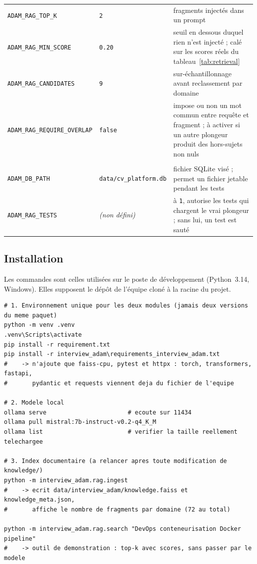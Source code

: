 \begin{small}
\begin{longtable}{@{}>{\cellflush}p{4.5cm}
                  >{\cellflush}p{3.2cm}
                  >{\cellflush}p{6.7cm}@{}}
\texttt{ADAM\_RAG\_TOP\_K} & \texttt{2} & fragments injectés dans un prompt \\
\texttt{ADAM\_RAG\_MIN\_SCORE} & \texttt{0.20} & seuil en dessous duquel rien n'est injecté ; calé sur les scores réels du tableau~\ref{tab:retrieval} \\
\texttt{ADAM\_RAG\_CANDIDATES} & \texttt{9} & sur-échantillonnage avant reclassement par domaine \\
\texttt{ADAM\_RAG\_REQUIRE\_OVERLAP} & \texttt{false} & impose ou non un mot commun entre requête et fragment ; à activer si un autre plongeur produit des hors-sujets non nuls \\
\multicolumn{3}{@{}l}{\textbf{Divers}}\\
\texttt{ADAM\_DB\_PATH} & \texttt{data/cv\_platform.db} & fichier SQLite visé ; permet un fichier jetable pendant les tests \\
\texttt{ADAM\_RAG\_TESTS} & \emph{(non défini)} & à \texttt{1}, autorise les tests qui chargent le vrai plongeur ; sans lui, un test est sauté \\
\end{longtable}
\end{small}

\subsection{Installation}

Les commandes sont celles utilisées sur le poste de développement (Python~3.14,
Windows). Elles supposent le dépôt de l'équipe cloné à la racine du projet.

\begin{lstlisting}[style=adamshell]
# 1. Environnement unique pour les deux modules (jamais deux versions du meme paquet)
python -m venv .venv
.venv\Scripts\activate
pip install -r requirement.txt
pip install -r interview_adam\requirements_interview_adam.txt
#    -> n'ajoute que faiss-cpu, pytest et httpx : torch, transformers, fastapi,
#       pydantic et requests viennent deja du fichier de l'equipe

# 2. Modele local
ollama serve                       # ecoute sur 11434
ollama pull mistral:7b-instruct-v0.2-q4_K_M
ollama list                        # verifier la taille reellement telechargee

# 3. Index documentaire (a relancer apres toute modification de knowledge/)
python -m interview_adam.rag.ingest
#    -> ecrit data/interview_adam/knowledge.faiss et knowledge_meta.json,
#       affiche le nombre de fragments par domaine (72 au total)

python -m interview_adam.rag.search "DevOps conteneurisation Docker pipeline"
#    -> outil de demonstration : top-k avec scores, sans passer par le modele
\end{lstlisting}

